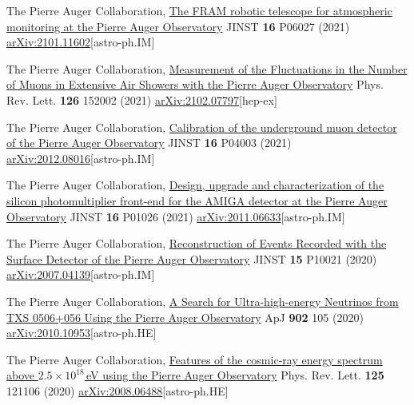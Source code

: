 \begin{etaremune}
\item {}The Pierre Auger Collaboration, \href{https://doi.org/10.1088/1748-0221/16/06/P06027}{The FRAM robotic telescope for atmospheric monitoring at the Pierre Auger Observatory} JINST {\bf{16}} P06027 (2021) \href{https://arxiv.org/abs/2101.11602}{arXiv:2101.11602}[astro-ph.IM]

\item {} The Pierre Auger Collaboration, \href{https://doi.org/10.1103/PhysRevLett.126.152002}{Measurement of the Fluctuations in the Number of Muons in Extensive Air Showers with the Pierre Auger Observatory} Phys. Rev. Lett. {\bf{126}} 152002 (2021) \href{https://arxiv.org/abs/2102.07797}{arXiv:2102.07797}[hep-ex]

\item {}The Pierre Auger Collaboration, \href{https://doi.org/10.1088/1748-0221/16/04/P04003}{Calibration of the underground muon detector of the Pierre Auger Observatory} JINST {\bf{16}} P04003 (2021) \href{https://arxiv.org/abs/2012.08016}{arXiv:2012.08016}[astro-ph.IM]

\item {}The Pierre Auger Collaboration, \href{https://doi.org/10.1088/1748-0221/16/01/P01026}{Design, upgrade and characterization of the silicon photomultiplier front-end for the AMIGA detector at the Pierre Auger Observatory} JINST {\bf{16}} P01026 (2021) \href{ https://arxiv.org/abs/2011.06633}{arXiv:2011.06633}[astro-ph.IM]

\item {}The Pierre Auger Collaboration, \href{https://doi.org/10.1088/1748-0221/15/10/P10021}{Reconstruction of Events Recorded with the Surface Detector of the Pierre Auger Observatory} JINST {\bf{15}} P10021 (2020) \href{https://arxiv.org/abs/2007.04139}{arXiv:2007.04139}[astro-ph.IM]

\item {}The Pierre Auger Collaboration, \href{https://doi.org/10.3847/1538-4357/abb476}{A Search for Ultra-high-energy Neutrinos from TXS 0506+056 Using the Pierre Auger Observatory} ApJ {\bf{902}} 105 (2020) \href{https://arxiv.org/abs/2010.10953}{arXiv:2010.10953}[astro-ph.HE]

\item {}The Pierre Auger Collaboration, \href{https://doi.org/10.1103/PhysRevLett.125.121106}{Features of the cosmic-ray energy spectrum above $2.5\times 10^{18}$\,eV using the Pierre Auger Observatory} Phys. Rev. Lett. {\bf{125}} 121106 (2020) \href{https://arxiv.org/abs/2008.06488}{arXiv:2008.06488}[astro-ph.HE]


\end{etaremune}
